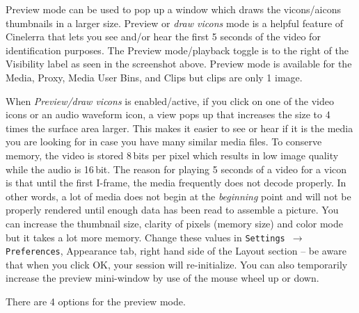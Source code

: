 Preview mode can be used to pop up a window which draws the vicons/aicons thumbnails in a larger size.  
Preview or \textit{draw vicons} mode is a helpful feature of Cinelerra that lets you see and/or hear the first 5 seconds of the video for identification purposes. 
The Preview mode/playback toggle is to the right of the Visibility label as seen in the screenshot above. 
Preview mode is available for the Media, Proxy, Media User Bins, and Clips but clips are only 1 image.

When \textit{Preview/draw vicons} is enabled/active, if you click on one of the video icons or an audio waveform icon, a view pops up that increases the size to 4 times the surface area larger. 
This makes it easier to see or hear if it is the media you are looking for in case you have many similar media files. 
To conserve memory, the video is stored 8\,bits per pixel which results in low image quality while the audio is 16\,bit. 
The reason for playing 5 seconds of a video for a vicon is that until the first I-frame, the media frequently does not decode properly.  
In other words, a lot of media does not begin at the \textit{beginning} point and will not be properly rendered until enough data has been read to assemble a picture.  
You can increase the thumbnail size, clarity of pixels (memory size) and color mode but it takes a lot more memory.  
Change these values in \texttt{Settings $\rightarrow$ Preferences}, Appearance tab, right hand side of the Layout section -- be aware that when you click OK, your session will re-initialize.  
You can also temporarily increase the preview mini-window by use of the mouse wheel up or down.

There are 4 options for the preview mode.

